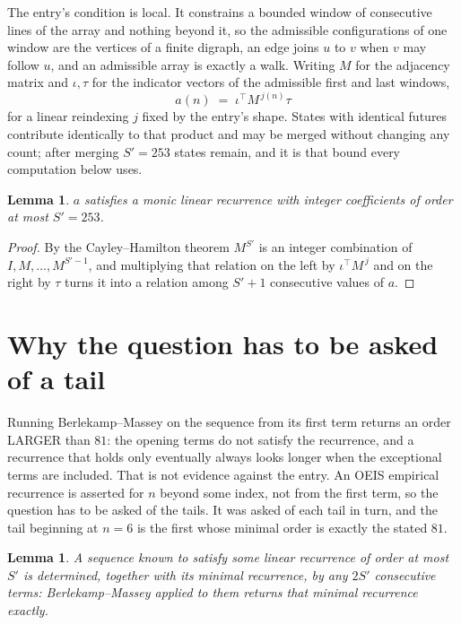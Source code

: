 \documentclass[11pt,a4paper]{article}
\theoremstyle{plain}
\newtheorem{lemma}[theorem]{Lemma}
\theoremstyle{definition}
\begin{document}
The entry's condition is local. It constrains a bounded window of consecutive lines of the
array and nothing beyond it, so the admissible configurations of one window are the vertices of
a finite digraph, an edge joins $u$ to $v$ when $v$ may follow $u$, and an admissible array is
exactly a walk. Writing $M$ for the adjacency matrix and $\iota,\tau$ for the indicator vectors
of the admissible first and last windows,
\[
a(n)\;=\;\iota^{\!\top}M^{\,j(n)}\tau
\]
for a linear reindexing $j$ fixed by the entry's shape. States with identical futures
contribute identically to that product and may be merged without changing any count; after
merging $S'=253$ states remain, and it is that bound every computation below uses.

\begin{lemma}\label{lem:cf}
$a$ satisfies a monic linear recurrence with integer coefficients of order at most $S'=253$.
\end{lemma}

\begin{proof}
By the Cayley--Hamilton theorem $M^{S'}$ is an integer combination of $I,M,\dots,M^{S'-1}$,
and multiplying that relation on the left by $\iota^{\!\top}M^{\,j}$ and on the right by
$\tau$ turns it into a relation among $S'+1$ consecutive values of $a$.
\end{proof}

\section{Why the question has to be asked of a tail}

Running Berlekamp--Massey on the sequence from its first term returns an order LARGER than $81$: the opening terms do not satisfy the recurrence, and a recurrence that holds only eventually always looks longer when the exceptional terms are included. That is not evidence against the entry. An OEIS empirical recurrence is asserted for $n$ beyond some index, not from the first term, so the question has to be asked of the tails. It was asked of each tail in turn, and the tail beginning at $n=6$ is the first whose minimal order is exactly the stated $81$.

\begin{lemma}\label{lem:bm}
A sequence known to satisfy some linear recurrence of order at most $S'$ is determined,
together with its minimal recurrence, by any $2S'$ consecutive terms: Berlekamp--Massey applied
to them returns that minimal recurrence exactly.
\end{lemma}
\end{document}
